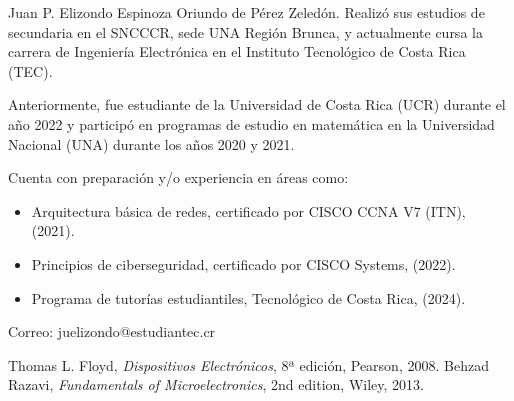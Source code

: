 \documentclass[journal]{IEEEtran}
\begin{document}
\begin{IEEEbiographynophoto}{Juan P. Elizondo Espinoza}
        Oriundo de Pérez Zeledón. Realizó sus estudios de secundaria en el SNCCCR, sede UNA Región Brunca, y actualmente cursa la carrera de Ingeniería Electrónica en el Instituto Tecnológico de Costa Rica (TEC). 
        
        Anteriormente, fue estudiante de la Universidad de Costa Rica (UCR) durante el año 2022 y participó en programas de estudio en matemática en la Universidad Nacional (UNA) durante los años 2020 y 2021. 
        
        Cuenta con preparación y/o experiencia en áreas como:
        \begin{itemize}
            \item Arquitectura básica de redes, certificado por CISCO CCNA V7 (ITN), (2021).
            \item Principios de ciberseguridad, certificado por CISCO Systems, (2022).
            \item Programa de tutorías estudiantiles, Tecnológico de Costa Rica, (2024).
        \end{itemize}
        
        Correo: juelizondo@estudiantec.cr
\end{IEEEbiographynophoto}


\begin{thebibliography}{11}
    Thomas L. Floyd, \emph{Dispositivos Electrónicos}, 8ª edición, Pearson, 2008.
    Behzad Razavi, \emph{Fundamentals of Microelectronics}, 2nd edition, Wiley, 2013.

\end{thebibliography}
\end{document}
